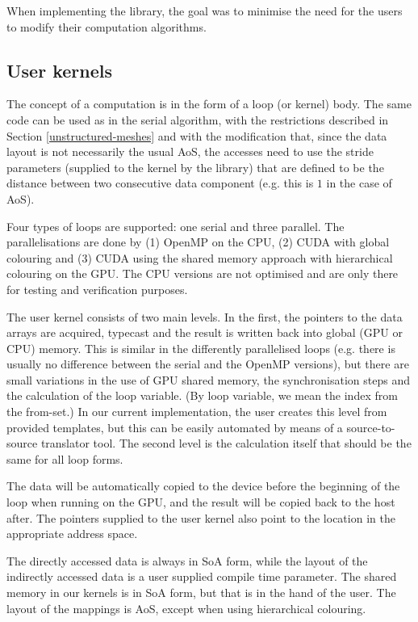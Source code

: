 When implementing the library, the goal was to minimise the need for the users
to modify their computation algorithms.

\subsection{User kernels}

The concept of a computation is in the form of a loop (or kernel) body. The same
code can be used as in the serial algorithm, with the restrictions described in
Section \ref{unstructured-meshes} and with the modification that, since the data
layout is not necessarily the usual AoS, the accesses need to use the stride
parameters (supplied to the kernel by the library) that are defined to be the
distance between two consecutive data component (e.g. this is $1$ in the case of
AoS).

Four types of loops are supported: one serial and three parallel. The
parallelisations are done by (1) OpenMP on the CPU, (2) CUDA with global
colouring and (3) CUDA using the shared memory approach with hierarchical
colouring on the GPU. The CPU versions are not optimised and are only there for
testing and verification purposes.

The user kernel consists of two main levels. In the first, the pointers to the
data arrays are acquired, typecast and the result is written back into global
(GPU or CPU) memory. This is similar in the differently parallelised loops (e.g.
there is usually no difference between the serial and the OpenMP versions), but
there are small variations in the use of GPU shared memory, the synchronisation
steps and the calculation of the loop variable. (By loop variable, we mean the
index from the from-set.) In our current implementation, the user creates this
level from provided templates, but this can be easily automated by means of a
source-to-source translator tool. The second level is the calculation itself
that should be the same for all loop forms.

The data will be automatically copied to the device before the beginning of the
loop when running on the GPU, and the result will be copied back to the host
after. The pointers supplied to the user kernel also point to the location in
the appropriate address space.

The directly accessed data is always in SoA form, while the layout of the
indirectly accessed data is a user supplied compile time parameter. The shared
memory in our kernels is in SoA form, but that is in the hand of the user. The
layout of the mappings is AoS, except when using hierarchical colouring.

